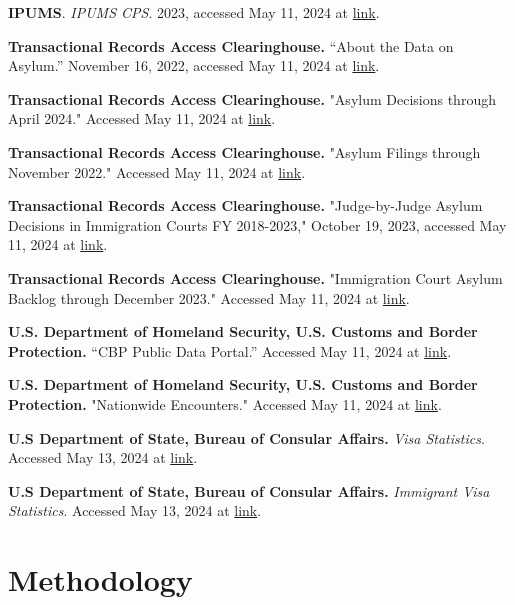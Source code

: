 \documentclass{article}
\begin{document}
\begin{hangparas}{.25in}{1}

\textbf{IPUMS}. \textit{IPUMS CPS}. 2023, accessed May 11, 2024 at \href{https://doi.org/10.18128/D030.V11.0}{link}.

\textbf{Transactional Records Access Clearinghouse.} “About the Data on Asylum.” November 16, 2022, accessed May 11, 2024 at \href{https://tinyurl.com/yn9s2vbx}{link}. 

\textbf{Transactional Records Access Clearinghouse.} "Asylum Decisions through April 2024." Accessed May 11, 2024 at \href{https://tinyurl.com/5n8pe5rn}{link}. 

\textbf{Transactional Records Access Clearinghouse.} "Asylum Filings through November 2022." Accessed May 11, 2024 at \href{https://tinyurl.com/3dkay4yr}{link}. 

\textbf{Transactional Records Access Clearinghouse.} "Judge-by-Judge Asylum Decisions in Immigration Courts FY 2018-2023," October 19, 2023, accessed May 11, 2024 at \href{https://tinyurl.com/3zanp3xj}{link}. 

\textbf{Transactional Records Access Clearinghouse.} "Immigration Court Asylum Backlog through December 2023." Accessed May 11, 2024 at \href{https://tinyurl.com/3pw26wcj}{link}. 

\textbf{U.S. Department of Homeland Security, U.S. Customs and Border Protection.} “CBP Public Data Portal.” Accessed May 11, 2024 at \href{https://www.cbp.gov/newsroom/stats/cbp-public-data-portal}{link}. 

\textbf{U.S. Department of Homeland Security, U.S. Customs and Border Protection.} "Nationwide Encounters." Accessed May 11, 2024 at \href{https://www.cbp.gov/document/stats/nationwide-encounters}{link}. 

\textbf{U.S Department of State, Bureau of Consular Affairs.} \textit{Visa Statistics}. Accessed May 13, 2024 at \href{https://travel.state.gov/content/travel/en/legal/visa-law0/visa-statistics.html}{link}. 

\textbf{U.S Department of State, Bureau of Consular Affairs.} \textit{Immigrant Visa Statistics}. Accessed May 13, 2024 at \href{https://travel.state.gov/content/travel/en/legal/visa-law0/visa-statistics/immigrant-visa-statistics.html}{link}. 

\end{hangparas}

\section{Methodology}
\end{document}
